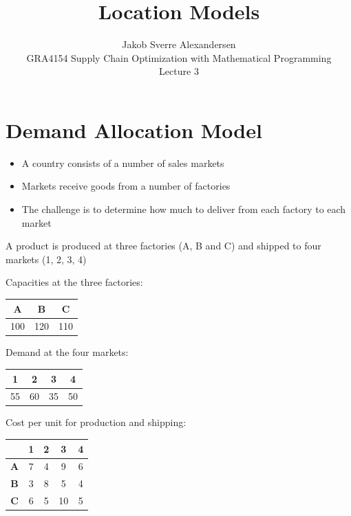 \documentclass[10pt]{article}
\begin{document}
 
\title{Location Models}
\author{Jakob Sverre Alexandersen\\
GRA4154 Supply Chain Optimization with Mathematical Programming\\
Lecture 3}
\maketitle

\tableofcontents
\newpage

\section{Demand Allocation Model}

\begin{itemize}
    \item A country consists of a number of sales markets 
    \item Markets receive goods from a number of factories 
    \item The challenge is to determine how much to deliver from each factory to each market 
\end{itemize}
A product is produced at three factories (A, B and C) and shipped to four markets (1, 2, 3, 4)

Capacities at the three factories: 
\begin{center}
    \begin{tabular}{|c|c|c|}
        \hline 
        \textbf{A} & \textbf{B} & \textbf{C}\\\hline 
        100 & 120 & 110\\\hline 
    \end{tabular}
\end{center}

Demand at the four markets: 

\begin{center}
    \begin{tabular}{|c|c|c|c|}
        \hline 
        \textbf{1} & \textbf{2} & \textbf{3} & \textbf{4}\\\hline 
        55 & 60 & 35 & 50\\\hline 
    \end{tabular}
\end{center}

Cost per unit for production and shipping:
\begin{center}
    \begin{tabular}{|c|c|c|c|c|}
        \hline 
        & \textbf{1} & \textbf{2} & \textbf{3} & \textbf{4}\\\hline 
        \textbf{A} & 7 & 4 & 9 & 6\\\hline 
        \textbf{B} & 3 & 8 & 5 & 4\\\hline 
        \textbf{C} & 6 & 5 & 10 & 5\\\hline 
    \end{tabular}
\end{center}
\end{document}
